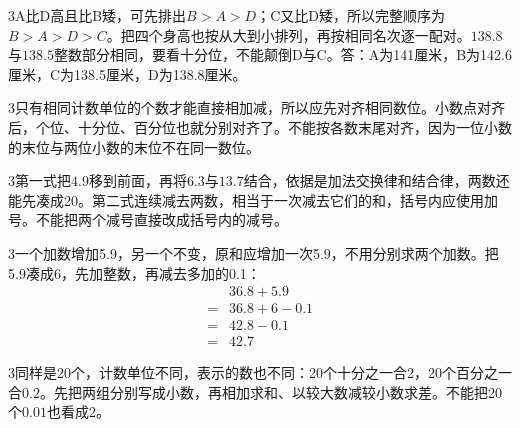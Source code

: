 \documentclass[multi=snippet,border={5bp 20bp 5bp 5bp}]{standalone}
\newenvironment{snippet}[3]{\begin{minipage}{#1bp}\color{answerred}\fontsize{#2}{#3}\selectfont\raggedright}{\end{minipage}}
\begin{document}
\begin{snippet}{505}{11.5}{14}\begin{multicols}{3}\raggedcolumns A比D高且比B矮，可先排出\(B>A>D\)\allowbreak ；C又比D矮，所以完整顺序为\(B>A>D>C\)\allowbreak 。把四个身高也按从大到小排列，再按相同名次逐一配对。\(138.8\)\allowbreak 与\(138.5\)\allowbreak 整数部分相同，要看十分位，不能颠倒D与C。答：A为141厘米，B为142.6厘米，C为138.5厘米，D为138.8厘米。\end{multicols}\end{snippet}
\begin{snippet}{505}{11.5}{14}\begin{multicols}{3}\raggedcolumns 只有相同计数单位的个数才能直接相加减，所以应先对齐相同数位。小数点对齐后，个位、十分位、百分位也就分别对齐了。不能按各数末尾对齐，因为一位小数的末位与两位小数的末位不在同一数位。\end{multicols}\end{snippet}
\begin{snippet}{505}{11.5}{14}\begin{multicols}{3}\raggedcolumns 第一式把\(4.9\)\allowbreak 移到前面，再将\(6.3\)\allowbreak 与\(13.7\)\allowbreak 结合，依据是加法交换律和结合律，两数还能先凑成20。第二式连续减去两数，相当于一次减去它们的和，括号内应使用加号。不能把两个减号直接改成括号内的减号。\end{multicols}\end{snippet}
\begin{snippet}{505}{11.5}{14}\begin{multicols}{3}\raggedcolumns 一个加数增加5.9，另一个不变，原和应增加一次5.9，不用分别求两个加数。把5.9凑成6，先加整数，再减去多加的0.1：\[\begin{aligned}&36.8+5.9\\={}&36.8+6-0.1\\={}&42.8-0.1\\={}&42.7\end{aligned}\]\end{multicols}\end{snippet}
\begin{snippet}{505}{11.5}{14}\begin{multicols}{3}\raggedcolumns 同样是20个，计数单位不同，表示的数也不同：20个十分之一合2，20个百分之一合\(0.2\)\allowbreak 。先把两组分别写成小数，再相加求和、以较大数减较小数求差。不能把20个\(0.01\)\allowbreak 也看成2。\end{multicols}\end{snippet}
\end{document}
